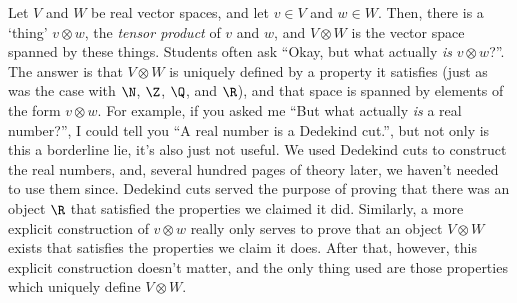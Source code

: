 Let $V$ and $W$ be real vector spaces, and let $v\in V$ and $w\in W$.  Then, there is a `thing' $v\otimes w$, the \emph{tensor product} of $v$ and $w$, and $V\otimes W$ is the vector space spanned by these things.  Students often ask ``Okay, but what actually \emph{is} $v\otimes w$?''.  The answer is that $V\otimes W$ is uniquely defined by a property it satisfies (just as was the case with $\N$, $\Z$, $\Q$, and $\R$), and that space is spanned by elements of the form $v\otimes w$.  For example, if you asked me ``But what actually \emph{is} a real number?'', I could tell you ``A real number is a Dedekind cut.'', but not only is this a borderline lie, it's also just not useful.  We used Dedekind cuts to construct the real numbers, and, several hundred pages of theory later, we haven't needed to use them since.  Dedekind cuts served the purpose of proving that there was an object $\R$ that satisfied the properties we claimed it did.  Similarly, a more explicit construction of $v\otimes w$ really only serves to prove that an object $V\otimes W$ exists that satisfies the properties we claim it does.  After that, however, this explicit construction doesn't matter, and the only thing used are those properties which uniquely define $V\otimes W$.

